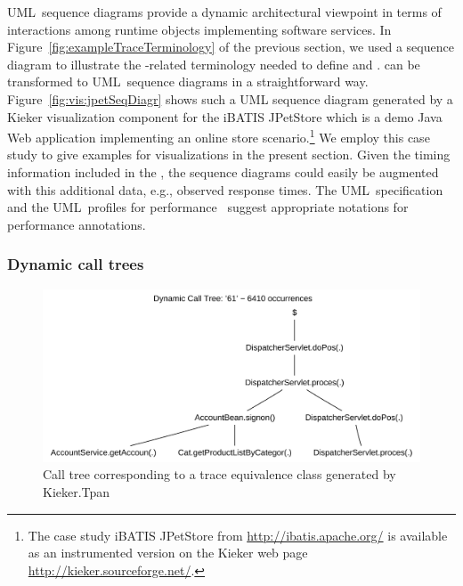 UML~sequence diagrams provide a dynamic architectural viewpoint in terms %
of interactions among runtime objects implementing software services. %
In Figure~\ref{fig:exampleTraceTerminology} of the previous section, we used %
a sequence diagram to illustrate the \trace{}-related terminology needed to define %
\executionTraces{} and \messageTraces{}. %
\MessageTraces{} can be transformed to UML~sequence diagrams in a straightforward way. %
Figure~\ref{fig:vis:jpetSeqDiagr} shows such a UML sequence diagram generated by %
a Kieker visualization component for the iBATIS JPetStore which is a demo Java Web application implementing an
online store scenario.\footnote{The case study iBATIS JPetStore from \url{http://ibatis.apache.org/} is available as an instrumented version on the Kieker web page \url{http://kieker.sourceforge.net/}.} We employ this case study to give examples for visualizations in the present section. %
Given the timing information included in the \executionTraces{}, the sequence diagrams %
could easily be augmented with this additional data, e.g., observed response %
times. The UML~specification~\citep{OMG2007UML22Superstructure} and %
the UML~profiles for performance~\citep{OMG2005UMLProfileForSchedulabilityPerformanceAndTimeV1-1,OMG2008UMLProfileForMARTEBeta2} %
suggest appropriate notations for performance annotations. %

\subsubsection{Dynamic call trees}

\begin{figure}\centering
\includegraphics[width=\columnwidth]{figures/20090710-163529-jpetstore-250Threads-400sDuration-200sRampup-dynamicCallTree61}
\caption{Call tree corresponding to a trace equivalence class generated by Kieker.Tpan}
\label{fig:vis:jpetDepCallTree}
\end{figure}


